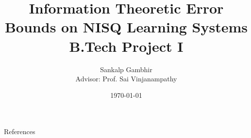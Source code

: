 \documentclass[
    aspectratio=169
]
{beamer}
\title{
    {\huge Information Theoretic Error Bounds on NISQ Learning Systems} \\
    {\large B.Tech Project I}
    }
\author[sgambhir@iitb.ac.in]{
    Sankalp Gambhir \\ 
    \vspace{1em}
        {
            \normalsize 
            \hspace{0.1em} 
            Advisor:
            Prof. Sai Vinjanampathy
        }
    \vspace{-1.3em}
}
\date{\today}
\begin{document}
    \begin{titlepage}
    \end{titlepage}

    

    

    

    

    

    \begin{frame}{References}
        \printbibliography
    \end{frame}
\end{document}
